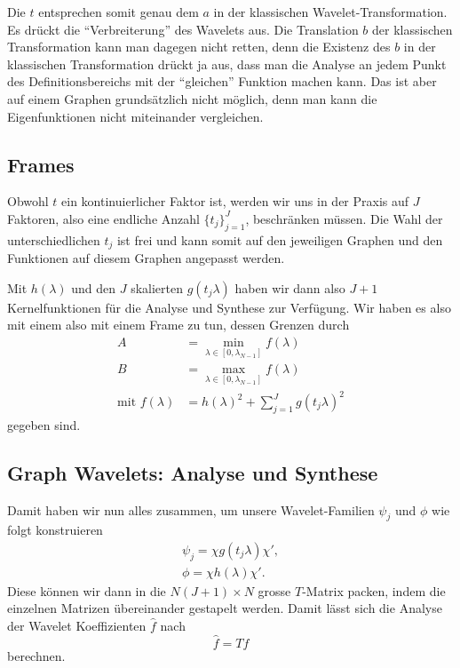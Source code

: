 Die $t$ entsprechen somit genau dem $a$ in der klassischen 
Wavelet-Transformation. Es dr\"uckt die ``Verbreiterung'' des Wavelets aus.
Die Translation $b$ der klassischen Transformation kann man dagegen nicht 
retten, denn die Existenz des $b$ in der klassischen Transformation drückt ja 
aus, dass man die Analyse an jedem Punkt des Definitionsbereichs mit der 
``gleichen'' Funktion machen kann. Das ist aber auf einem Graphen 
grunds\"atzlich nicht m\"oglich, denn man kann die Eigenfunktionen nicht 
miteinander vergleichen.

\subsection{Frames}

Obwohl $t$ ein kontinuierlicher Faktor ist, werden wir uns in der Praxis auf 
$J$ Faktoren, also eine endliche Anzahl $\{t_j\}^J_{j=1}$, beschr\"anken 
m\"ussen. Die Wahl der unterschiedlichen $t_j$ ist frei und kann somit auf den 
jeweiligen Graphen und den Funktionen auf diesem Graphen angepasst werden. 

Mit $h(\lambda)$ und den $J$ skalierten $g(t_j\lambda)$ haben wir dann 
also $J + 1$ Kernelfunktionen f\"ur die Analyse und Synthese zur Verf\"ugung. 
Wir haben es also mit einem also mit einem Frame zu tun, dessen Grenzen durch
\begin{align*}
A &= \min_{\lambda \in \left[0, \lambda_{N-1}\right]} f(\lambda) \\
B &= \max_{\lambda \in \left[0, \lambda_{N-1}\right]} f(\lambda) \\
\text{mit } f(\lambda) &= h(\lambda)^2 + \sum_{j = 1}^{J} g(t_j\lambda)^2
\end{align*}
gegeben sind.

\subsection{Graph Wavelets: Analyse und Synthese}

Damit haben wir nun alles zusammen, um unsere Wavelet-Familien $\psi_j$ und 
$\phi$ wie folgt konstruieren
\begin{align}
\psi_j = \chi g(t_j\lambda) \chi',
\label{eq:sgwt:psi}
\\
\phi = \chi h(\lambda) \chi'.
\label{eq:sgwt:phi}
\end{align}
Diese k\"onnen wir dann in die $N(J+1)\times N$ grosse $T$-Matrix 
packen, indem die einzelnen Matrizen \"ubereinander gestapelt werden. Damit 
l\"asst sich die Analyse der Wavelet Koeffizienten $\hat{f}$ nach
\begin{equation}
\hat{f} = T f
\label{eq:sgwt:hatf}
\end{equation}
berechnen.

